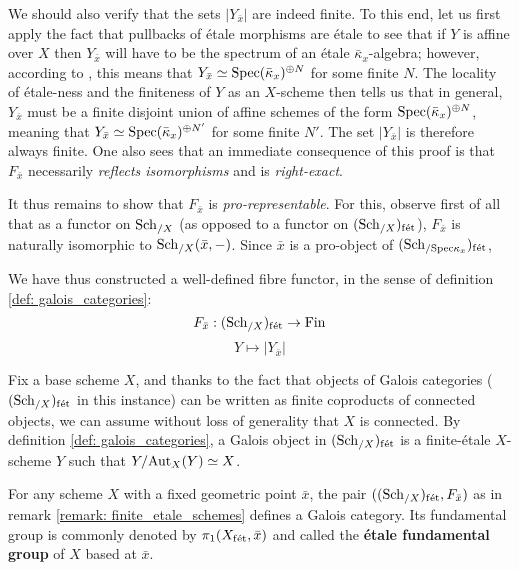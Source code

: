 \begin{remark}
            We should also verify that the sets $|Y_{\bar{x}}|$ are indeed finite. To this end, let us first apply the fact that pullbacks of \'etale morphisms are \'etale to see that if $Y$ is affine over $X$ then $Y_{\bar{x}}$ will have to be the spectrum of an \'etale $\bar{\kappa}_x$-algebra; however, according to \cite[\href{https://stacks.math.columbia.edu/tag/00U3}{Tag 00U3}]{stacks}, this means that $Y_{\bar{x}} \simeq \mathrm{Spec} (\bar{\kappa}_x)^{\oplus N}$ for some finite $N$. The locality of \'etale-ness and the finiteness of $Y$ as an $X$-scheme then tells us that in general, $Y_{\bar{x}}$ must be a finite disjoint union of affine schemes of the form $\mathrm{Spec} (\bar{\kappa}_x)^{\oplus N}$, meaning that $Y_{\bar{x}} \simeq \mathrm{Spec} (\bar{\kappa}_x)^{\oplus N'}$ for some finite $N'$. The set $|Y_{\bar{x}}|$ is therefore always finite. One also sees that an immediate consequence of this proof is that $F_{\bar{x}}$ necessarily \textit{reflects isomorphisms} and is \textit{right-exact}. 
            
            It thus remains to show that $F_{\bar{x}}$ is \textit{pro-representable}. For this, observe first of all that as a functor on $\mathrm{Sch}_{/X}$ (as opposed to a functor on $(\mathrm{Sch}_{/X})_{\mathrm{f\acute{e}t}}$), $F_{\bar{x}}$ is naturally isomorphic to $\mathrm{Sch}_{/X}(\bar{x}, -)$. Since $\bar{x}$ is a pro-object of $(\mathrm{Sch}_{/\mathrm{Spec} \kappa_x})_{\mathrm{f\acute{e}t}}$, 
            
            We have thus constructed a well-defined fibre functor, in the sense of definition \ref{def: galois_categories}:
                $$F_{\bar{x}}: (\mathrm{Sch}_{/X})_{\mathrm{f\acute{e}t}} \to \mathrm{Fin}$$
                $$Y \mapsto |Y_{\bar{x}}|$$
        \end{remark}
        \begin{remark} \label{remark: galois_schemes}
            Fix a base scheme $X$, and thanks to the fact that objects of Galois categories ($(\mathrm{Sch}_{/X})_{\mathrm{f\acute{e}t}}$ in this instance) can be written as finite coproducts of connected objects, we can assume without loss of generality that $X$ is connected. By definition \ref{def: galois_categories}, a Galois object in $(\mathrm{Sch}_{/X})_{\mathrm{f\acute{e}t}}$ is a finite-\'etale $X$-scheme $Y$ such that $Y/\mathrm{Aut}_X(Y) \simeq X$. 
        \end{remark}
        \begin{definition} \label{def: etale_fundamental_groups}
            For any scheme $X$ with a fixed geometric point $\bar{x}$, the pair $((\mathrm{Sch}_{/X})_{\mathrm{f\acute{e}t}}, F_{\bar{x}})$ as in remark \ref{remark: finite_etale_schemes} defines a Galois category. Its fundamental group is commonly denoted by $\pi_1(X_{\mathrm{f\acute{e}t}}, \bar{x})$ and called the \textbf{\'etale fundamental group} of $X$ based at $\bar{x}$.
        \end{definition}
